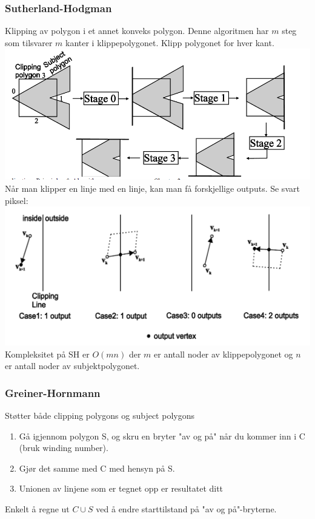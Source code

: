 \subsubsection{Sutherland-Hodgman}
Klipping av polygon i et annet konveks polygon. Denne algoritmen har $m$ steg som tilsvarer $m$ kanter i klippepolygonet. Klipp polygonet for hver kant.
\\ \includegraphics[width=\textwidth]{Bilder/sh.png}
Når man klipper en linje med en linje, kan man få forskjellige outputs. Se svart piksel:
\\ \includegraphics[width=\textwidth]{Bilder/sho.png}
Kompleksitet på SH er $O(mn)$ der $m$ er antall noder av klippepolygonet og $n$ er antall noder av subjektpolygonet.

\subsubsection{Greiner-Hornmann}
Støtter både clipping polygons og subject polygons
\begin{enumerate}
    \item Gå igjennom polygon S, og skru en bryter "av og på" når du kommer inn i C (bruk winding number).
    \item Gjør det samme med C med hensyn på S.
    \item Unionen av linjene som er tegnet opp er resultatet ditt
\end{enumerate}
Enkelt å regne ut $C \cup S$ ved å endre starttilstand på "av og på"-bryterne.

